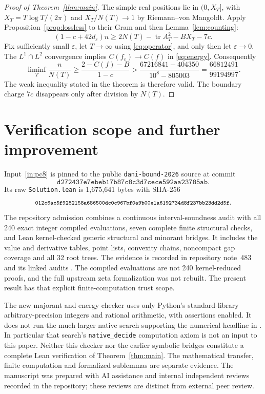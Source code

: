 \documentclass[11pt,a4paper]{article}
\theoremstyle{remark}
\DeclareMathOperator{\tr}{tr}
\begin{document}
\begin{proof}[Proof of Theorem~\ref{thm:main}]
The simple real positions lie in $(0,X_T]$, with
$X_T=T\log T/(2\pi)$ and $X_T/N(T)\to1$ by
Riemann--von Mangoldt. Apply Proposition~\ref{prop:lossless}
to their Gram and then Lemma~\ref{lem:counting}:
\[
 (1-c+42d_\varepsilon)n
 \ge2N(T)-\tr A_T^2-BX_T-7c.
\]
Fix sufficiently small $\varepsilon$, let $T\to\infty$ using
\eqref{eq:operator}, and only then let $\varepsilon\to0$.
The $L^1\cap L^2$ convergence implies
$C(f_\varepsilon)\to C(f)$ in \eqref{eq:energy}.
Consequently
\[
 \liminf_T\frac{n}{N(T)}
 \ge\frac{2-C(f)-B}{1-c}
 >\frac{67216841-404350}{10^8-805003}
 =\frac{66812491}{99194997}.
\]
The weak inequality stated in the theorem is therefore valid.
The boundary charge $7c$ disappears only after division by $N(T)$.
\end{proof}

\section{Verification scope and further improvement}\label{sec:trust}

Input~\ref{in:pc8} is pinned to the public
\texttt{dani-bound-2026} source \cite{PC8} at commit
\[
\texttt{d272437e7ebeb17b87c8c3d7cece592aa23785ab}.
\]
Its raw \texttt{Solution.lean} is 1,675,641 bytes with SHA-256
\[
\texttt{\footnotesize 012c6ac5f9282158a686500dc0c967bf0a9b00e1a6192734d8f237bb23dd2d5f}.
\]
The repository admission combines a continuous interval-soundness
audit with all 240 exact integer compiled evaluations, seven complete
finite structural checks, and Lean kernel-checked generic structural
and minorant bridges. It includes the value and derivative tables,
point lists, convexity chains, noncompact gap coverage and all 32
root trees. The evidence is recorded in repository note~483
and its linked audits \cite{Repo}.
The compiled evaluations are not 240 kernel-reduced proofs, and
the full upstream zeta formalization was not rebuilt.
The present result has that explicit finite-computation trust scope.

The new majorant and energy checker uses only Python's standard-library
arbitrary-precision integers and rational arithmetic, with assertions
enabled. It does not run the much larger native search supporting
the numerical headline in \cite{Knaus}. In particular that search's
\texttt{native\_decide} computation axiom is not an input to this paper.
Neither this checker nor the earlier symbolic bridges constitute
a complete Lean verification of Theorem~\ref{thm:main}.
The mathematical transfer, finite computation and formalized
sublemmas are separate evidence.
The manuscript was prepared with AI assistance and internal
independent reviews recorded in the repository; these reviews are
distinct from external peer review.
\end{document}
